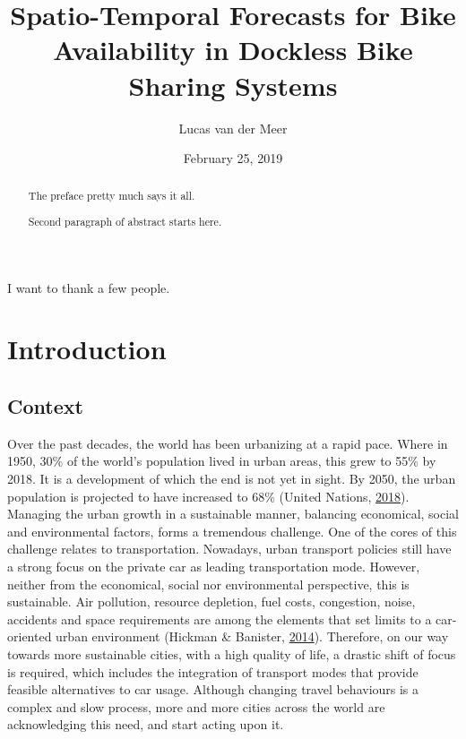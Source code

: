 \documentclass[12pt,oneside]{reedthesis}
\title{Spatio-Temporal Forecasts for Bike Availability in Dockless Bike Sharing
Systems}
\author{Lucas van der Meer}
\date{February 25, 2019}
\begin{document}
  \maketitle

\frontmatter %
\pagestyle{empty} %
  \begin{acknowledgements}
    I want to thank a few people.
  \end{acknowledgements}

  \hypersetup{linkcolor=black}
  \setcounter{tocdepth}{4}
  \tableofcontents

  \listoftables

  \listoffigures
  \begin{abstract}
    The preface pretty much says it all. \par
    
    Second paragraph of abstract starts here.
  \end{abstract}

\mainmatter %
\pagestyle{fancyplain} %

\chapter{Introduction}\label{introduction}

\section{Context}\label{context}

Over the past decades, the world has been urbanizing at a rapid pace.
Where in 1950, 30\% of the world's population lived in urban areas, this
grew to 55\% by 2018. It is a development of which the end is not yet in
sight. By 2050, the urban population is projected to have increased to
68\% (United Nations, \protect\hyperlink{ref-un2018}{2018}). Managing
the urban growth in a sustainable manner, balancing economical, social
and environmental factors, forms a tremendous challenge. One of the
cores of this challenge relates to transportation. Nowadays, urban
transport policies still have a strong focus on the private car as
leading transportation mode. However, neither from the economical,
social nor environmental perspective, this is sustainable. Air
pollution, resource depletion, fuel costs, congestion, noise, accidents
and space requirements are among the elements that set limits to a
car-oriented urban environment (Hickman \& Banister,
\protect\hyperlink{ref-hickman2014}{2014}). Therefore, on our way
towards more sustainable cities, with a high quality of life, a drastic
shift of focus is required, which includes the integration of transport
modes that provide feasible alternatives to car usage. Although changing
travel behaviours is a complex and slow process, more and more cities
across the world are acknowledging this need, and start acting upon it.
\end{document}
